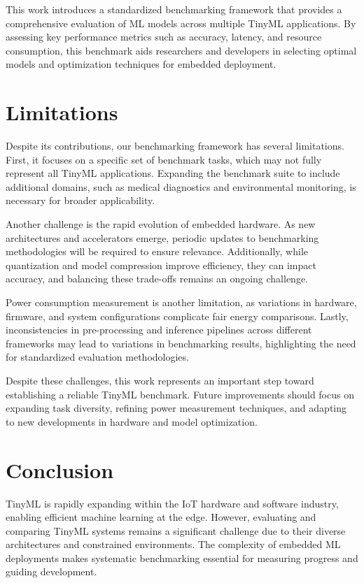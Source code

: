 \documentclass[conference]{IEEEtran}
\begin{document}
This work introduces a standardized benchmarking framework that provides a comprehensive evaluation of ML models across multiple TinyML applications. By assessing key performance metrics such as accuracy, latency, and resource consumption, this benchmark aids researchers and developers in selecting optimal models and optimization techniques for embedded deployment.


\section{Limitations}

Despite its contributions, our benchmarking framework has several limitations. First, it focuses on a specific set of benchmark tasks, which may not fully represent all TinyML applications. Expanding the benchmark suite to include additional domains, such as medical diagnostics and environmental monitoring, is necessary for broader applicability.

Another challenge is the rapid evolution of embedded hardware. As new architectures and accelerators emerge, periodic updates to benchmarking methodologies will be required to ensure relevance. Additionally, while quantization and model compression improve efficiency, they can impact accuracy, and balancing these trade-offs remains an ongoing challenge.

Power consumption measurement is another limitation, as variations in hardware, firmware, and system configurations complicate fair energy comparisons. Lastly, inconsistencies in pre-processing and inference pipelines across different frameworks may lead to variations in benchmarking results, highlighting the need for standardized evaluation methodologies.

Despite these challenges, this work represents an important step toward establishing a reliable TinyML benchmark. Future improvements should focus on expanding task diversity, refining power measurement techniques, and adapting to new developments in hardware and model optimization.


\section{Conclusion}

TinyML is rapidly expanding within the IoT hardware and software industry, enabling efficient machine learning at the edge. However, evaluating and comparing TinyML systems remains a significant challenge due to their diverse architectures and constrained environments. The complexity of embedded ML deployments makes systematic benchmarking essential for measuring progress and guiding development.
\end{document}
